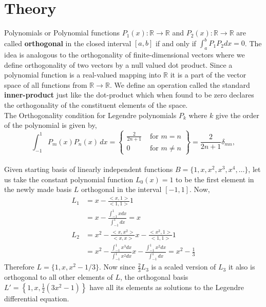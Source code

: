 \documentclass[12pt]{article}
\begin{document}
\section{Theory}
Polynomials or Polynomial functions $ P_1(x):\mathbb{R}\rightarrow  \mathbb{R} $ and $ P_2(x) : \mathbb{R} \rightarrow \mathbb{R}$ are called \textbf{orthogonal} in the closed interval $ [a,b] $ if and only if $ {\displaystyle \int_{a}^{b}P_1 P_2 dx } = 0 $. The idea is analogous to the orthogonality of finite-dimensional vectors where we define orthogonality of two vectors by a null valued dot product. Since a polynomial function is a real-valued mapping into $ \mathbb{R} $ it is a part of the vector space of all functions from $ \mathbb{R} \rightarrow \mathbb{R} $. We define an operation called the standard \textbf{inner-product} just like the dot-product which when found to be zero declares the orthogonality of the constituent elements of the space.\\[2mm]
The Orthogonality condition for Legendre polynomials $ P_k $ where $ k $ give the order of the polynomial is given by,
\begin{equation} \label{ortho-leg:}
	{\displaystyle \int _{-1}^{1}P_{m}(x)P_{n}(x)\,dx=\left\{\begin{array}{lr}
			\frac{2}{2n+1} & \text{ for } m=n\\
			0 & \text{ for } m\neq n 
		\end{array}\right\}={\frac {2}{2n+1}}\delta _{mn},}
\end{equation}
\noindent \\
Given starting basis of linearly independent functions $ B = \{1,x,x^2,x^3,x^4,\dots \} $, let us take the constant polynomial function $L_0(x) = 1 $ to be the first element in the newly made basis  $ L $ orthogonal in the interval $ \left[-1,1 \right] $.
Now, 
\begin{align}
	L_1 &= x - \frac{<x,1>}{<1,1>}1 \nonumber\\
	&= x - \frac{\int_{-1}^{1}xdx}{\int_{-1}^{1}dx} = x  \\
	L_2 &= x^2 - \frac{<x,x^2>}{<x,x>}x - \frac{<x^2,1>}{<1,1>}1 \nonumber \\
	&= x^2 - \frac{\int_{-1}^{1}x^3dx}{\int_{-1}^{1}x^2dx}x - \frac{\int_{-1}^{1}x^2dx}{\int_{-1}^{1}dx} = x^2 - \frac{1}{3} 
\end{align}
Therefore $ L = \{1,x,x^2-1/3\} $. Now since $\frac{2}{3}L_3$ is a scaled version of $ L_3 $ it also is orthogonal to all other elements of $ L $, 
the orthogonal basis $ { L' = \left\{1,x,\frac{1}{2}(3x^2 - 1)\right\}}$ have all its elements as solutions to the Legendre differential equation.\\
\end{document}
